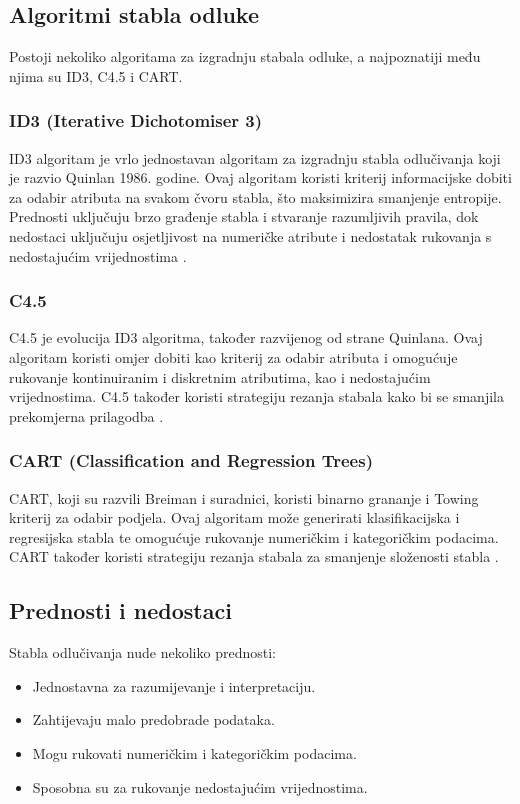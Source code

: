 \documentclass[zavrsnirad,upload]{fer}
\begin{document}
\subsection{Algoritmi stabla odluke}
Postoji nekoliko algoritama za izgradnju stabala odluke, a najpoznatiji među njima su ID3, C4.5 i CART.

\subsubsection{ID3 (Iterative Dichotomiser 3)}
ID3 algoritam je vrlo jednostavan algoritam za izgradnju stabla odlučivanja koji je razvio Quinlan 1986. godine. Ovaj algoritam koristi kriterij informacijske dobiti za odabir atributa na svakom čvoru stabla, što maksimizira smanjenje entropije. Prednosti uključuju brzo građenje stabla i stvaranje razumljivih pravila, dok nedostaci uključuju osjetljivost na numeričke atribute i nedostatak rukovanja s nedostajućim vrijednostima \cite{singh2014}.

\subsubsection{C4.5}
C4.5 je evolucija ID3 algoritma, također razvijenog od strane Quinlana. Ovaj algoritam koristi omjer dobiti kao kriterij za odabir atributa i omogućuje rukovanje kontinuiranim i diskretnim atributima, kao i nedostajućim vrijednostima. C4.5 također koristi strategiju rezanja stabala kako bi se smanjila prekomjerna prilagodba \cite{singh2014}.

\subsubsection{CART (Classification and Regression Trees)}
CART, koji su razvili Breiman i suradnici, koristi binarno grananje i Towing kriterij za odabir podjela. Ovaj algoritam može generirati klasifikacijska i regresijska stabla te omogućuje rukovanje numeričkim i kategoričkim podacima. CART također koristi strategiju rezanja stabala za smanjenje složenosti stabla \cite{singh2014}.


\subsection{Prednosti i nedostaci}
Stabla odlučivanja nude nekoliko prednosti:
\begin{itemize}
	\item Jednostavna za razumijevanje i interpretaciju.
	\item Zahtijevaju malo predobrade podataka.
	\item Mogu rukovati numeričkim i kategoričkim podacima.
	\item Sposobna su za rukovanje nedostajućim vrijednostima.
\end{itemize}
\end{document}
